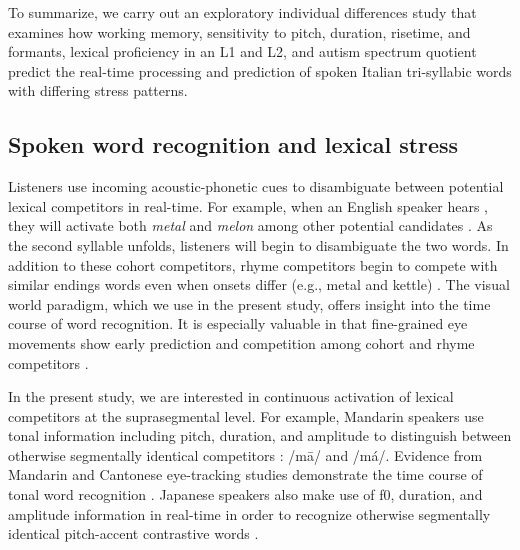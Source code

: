 To summarize, we carry out an exploratory individual differences study that examines how working memory, sensitivity to pitch, duration, risetime, and formants, lexical proficiency in an L1 and L2, and autism spectrum quotient predict the real-time processing and prediction of spoken Italian tri-syllabic words with differing stress patterns.

\subsection{Spoken word recognition and lexical stress}

Listeners use incoming acoustic-phonetic cues to disambiguate between potential lexical competitors in real-time. For example, when an English speaker hears , they will activate both \textit{metal} and \textit{melon} among other potential candidates \citep{Marslen1980}. As the second syllable unfolds, listeners will begin to disambiguate the two words. In addition to these cohort competitors, rhyme competitors begin to compete with similar endings words even when onsets differ (e.g., metal and kettle) \citep{Allopenna_1998}. The visual world paradigm, which we use in the present study, offers insight into the time course of word recognition. It is especially valuable in that fine-grained eye movements show early prediction and competition among cohort and rhyme competitors \citep{Allopenna_1998}.

In the present study, we are interested in continuous activation of lexical competitors at the suprasegmental level. For example, Mandarin speakers use tonal information including pitch, duration, and amplitude to distinguish between otherwise segmentally identical competitors \citep{Lee2008, Zhang2022, fox_1985}: /m\=a/ and /m\'a/. Evidence from Mandarin and Cantonese eye-tracking studies demonstrate the time course of tonal word recognition \citep{zou_2022, qin_2022, Nixon2016}. Japanese speakers also make use of f0, duration, and amplitude information in real-time in order to recognize otherwise segmentally identical pitch-accent contrastive words \citep{goss_2014, Cutler1999, Ito2024}.

